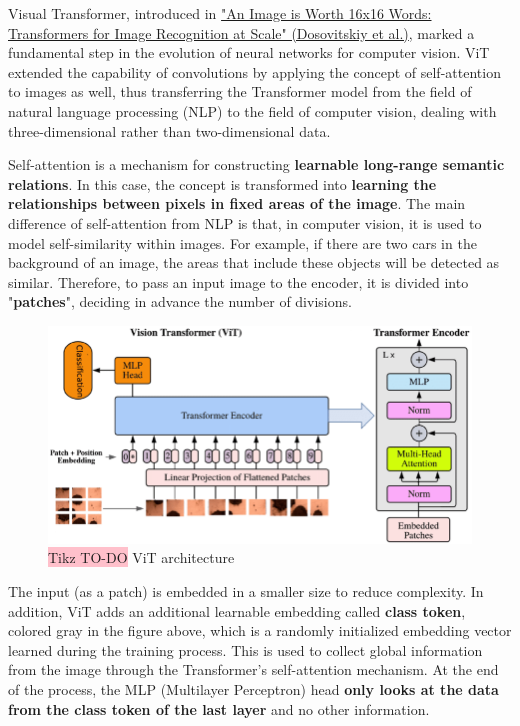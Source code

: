 Visual Transformer, introduced in \href{https://arxiv.org/pdf/2010.11929}{"An Image is Worth 16x16 Words: Transformers for Image Recognition at Scale" (Dosovitskiy et al.)}, marked a fundamental step in the evolution of neural networks for computer vision. ViT extended the capability of convolutions by applying the concept of self-attention to images as well, thus transferring the Transformer model from the field of natural language processing (NLP) to the field of computer vision, dealing with three-dimensional rather than two-dimensional data.

Self-attention is a mechanism for constructing \textbf{learnable long-range semantic relations}. In this case, the concept is transformed into \textbf{learning the relationships between pixels in fixed areas of the image}. The main difference of self-attention from NLP is that, in computer vision, it is used to model self-similarity within images. For example, if there are two cars in the background of an image, the areas that include these objects will be detected as similar. Therefore, to pass an input image to the encoder, it is divided into "\textbf{patches}", deciding in advance the number of divisions.

\begin{figure}[H]
    \centering
    \includegraphics[width=\linewidth]{tikz/chapter8 - Vision Transformer.png}
    \caption{{\color{red}\colorbox{pink}{Tikz TO-DO}} ViT architecture}
\end{figure}

The input (as a patch) is embedded in a smaller size to reduce complexity. In addition, ViT adds an additional learnable embedding called \textbf{class token}, colored gray in the figure above, which is a randomly initialized embedding vector learned during the training process. This is used to collect global information from the image through the Transformer's self-attention mechanism. At the end of the process, the MLP (Multilayer Perceptron) head \textbf{only looks at the data from the class token of the last layer} and no other information.

